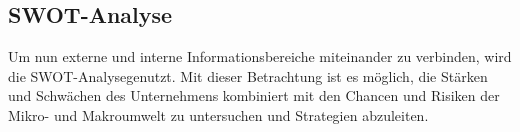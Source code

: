 \subsection{SWOT-Analyse} \label{swot}
Um nun externe und interne Informationsbereiche miteinander zu verbinden, wird die \as SWOT-Analyse\adl genutzt. Mit
dieser Betrachtung ist es möglich, die Stärken und Schwächen des Unternehmens kombiniert mit den Chancen und Risiken der
Mikro- und Makroumwelt zu untersuchen und Strategien abzuleiten.